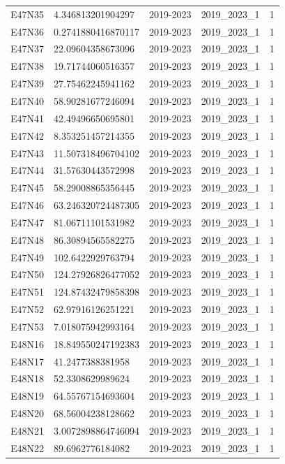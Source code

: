 \begin{landscape}
\begin{longtable}{lllll}
E47N35 & 4.346813201904297 & 2019-2023 & 2019\_2023\_1 & 1 \\
E47N36 & 0.2741880416870117 & 2019-2023 & 2019\_2023\_1 & 1 \\
E47N37 & 22.09604358673096 & 2019-2023 & 2019\_2023\_1 & 1 \\
E47N38 & 19.71744060516357 & 2019-2023 & 2019\_2023\_1 & 1 \\
E47N39 & 27.75462245941162 & 2019-2023 & 2019\_2023\_1 & 1 \\
E47N40 & 58.90281677246094 & 2019-2023 & 2019\_2023\_1 & 1 \\
E47N41 & 42.49496650695801 & 2019-2023 & 2019\_2023\_1 & 1 \\
E47N42 & 8.353251457214355 & 2019-2023 & 2019\_2023\_1 & 1 \\
E47N43 & 11.507318496704102 & 2019-2023 & 2019\_2023\_1 & 1 \\
E47N44 & 31.57630443572998 & 2019-2023 & 2019\_2023\_1 & 1 \\
E47N45 & 58.29008865356445 & 2019-2023 & 2019\_2023\_1 & 1 \\
E47N46 & 63.246320724487305 & 2019-2023 & 2019\_2023\_1 & 1 \\
E47N47 & 81.06711101531982 & 2019-2023 & 2019\_2023\_1 & 1 \\
E47N48 & 86.30894565582275 & 2019-2023 & 2019\_2023\_1 & 1 \\
E47N49 & 102.6422929763794 & 2019-2023 & 2019\_2023\_1 & 1 \\
E47N50 & 124.27926826477052 & 2019-2023 & 2019\_2023\_1 & 1 \\
E47N51 & 124.87432479858398 & 2019-2023 & 2019\_2023\_1 & 1 \\
E47N52 & 62.97916126251221 & 2019-2023 & 2019\_2023\_1 & 1 \\
E47N53 & 7.018075942993164 & 2019-2023 & 2019\_2023\_1 & 1 \\
E48N16 & 18.849550247192383 & 2019-2023 & 2019\_2023\_1 & 1 \\
E48N17 & 41.2477388381958 & 2019-2023 & 2019\_2023\_1 & 1 \\
E48N18 & 52.3308629989624 & 2019-2023 & 2019\_2023\_1 & 1 \\
E48N19 & 64.55767154693604 & 2019-2023 & 2019\_2023\_1 & 1 \\
E48N20 & 68.56004238128662 & 2019-2023 & 2019\_2023\_1 & 1 \\
E48N21 & 3.0072898864746094 & 2019-2023 & 2019\_2023\_1 & 1 \\
E48N22 & 89.6962776184082 & 2019-2023 & 2019\_2023\_1 & 1 \\

\end{longtable}
\end{landscape}
